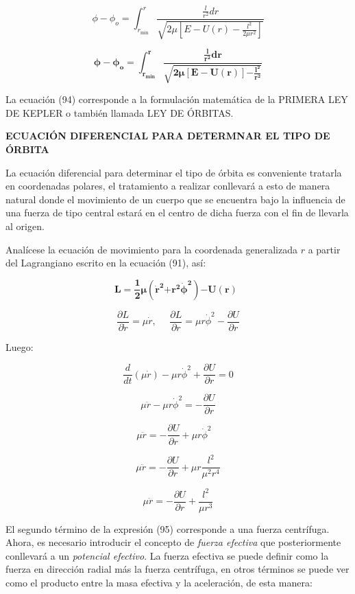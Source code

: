 \documentclass[]{article}
\begin{document}
\[\phi - \phi_{o} = \int_{r_{\min}}^{r}\frac{\frac{l}{r^{2}}dr}{\sqrt{2\mu\left\lbrack E - U(r) - \frac{l^{2}}{2\mu r^{2}} \right\rbrack}}\]

\[\mathbf{\phi -}\mathbf{\phi}_{\mathbf{o}}\mathbf{=}\int_{\mathbf{r}_{\mathbf{\min}}}^{\mathbf{r}}\frac{\frac{\mathbf{l}}{\mathbf{r}^{\mathbf{2}}}\mathbf{dr}}{\sqrt{\mathbf{2}\mathbf{\mu}\left\lbrack \mathbf{E - U}\left( \mathbf{r} \right) \right\rbrack\mathbf{-}\frac{\mathbf{l}^{\mathbf{2}}}{\mathbf{r}^{\mathbf{2}}}}}\]

La ecuación (94) corresponde a la formulación matemática de la PRIMERA
LEY DE KEPLER o también llamada LEY DE ÓRBITAS.

\textbf{ECUACIÓN DIFERENCIAL PARA DETERMNAR EL TIPO DE ÓRBITA}

La ecuación diferencial para determinar el tipo de órbita es conveniente
tratarla en coordenadas polares, el tratamiento a realizar conllevará a
esto de manera natural donde el movimiento de un cuerpo que se encuentra
bajo la influencia de una fuerza de tipo central estará en el centro de
dicha fuerza con el fin de llevarla al origen.

Analícese la ecuación de movimiento para la coordenada generalizada
\(r\) a partir del Lagrangiano escrito en la ecuación (91), así:

\[\mathbf{L =}\frac{\mathbf{1}}{\mathbf{2}}\mathbf{\mu}\left( {\dot{\mathbf{r}}}^{\mathbf{2}}\mathbf{+}\mathbf{r}^{\mathbf{2}}{\dot{\mathbf{\phi}}}^{\mathbf{2}} \right)\mathbf{- U}\left( \mathbf{r} \right)\mathbf{\ \ }\]

\[\frac{\partial L}{\partial\dot{r}} = \mu\dot{r},\ \ \ \ \ \ \frac{\partial L}{\partial r} = \mu r{\dot{\phi}}^{2} - \frac{\partial U}{\partial r}\]

Luego:

\[\frac{d}{dt}\left( \mu\dot{r} \right) - \mu r{\dot{\phi}}^{2} + \frac{\partial U}{\partial r} = 0\]

\[\mu\ddot{r} - \mu r{\dot{\phi}}^{2} = - \frac{\partial U}{\partial r}\]

\[\mu\ddot{r} = - \frac{\partial U}{\partial r} + \mu r{\dot{\phi}}^{2}\ \ \ \ \]

\[\mu\ddot{r} = - \frac{\partial U}{\partial r} + \mu r\frac{l^{2}}{\mu^{2}r^{4}}\]

\[\mu\ddot{r} = - \frac{\partial U}{\partial r} + \frac{l^{2}}{{\mu r}^{3}}\]

El segundo término de la expresión (95) corresponde a una fuerza
centrífuga. Ahora, es necesario introducir el concepto de \emph{fuerza
efectiva} que posteriormente conllevará a un \emph{potencial efectivo}.
La fuerza efectiva se puede definir como la fuerza en dirección radial
más la fuerza centrífuga, en otros términos se puede ver como el
producto entre la masa efectiva y la aceleración, de esta manera:
\end{document}
